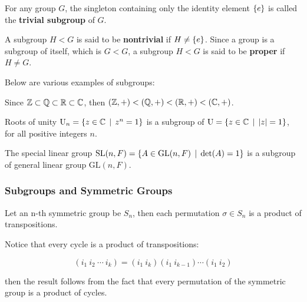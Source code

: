 \documentclass[a4paper,12pt]{article}
\begin{document}
\begin{dft}
  For any group $G$, the singleton containing only the identity element $\left\{ e\right\}$ is called the \textbf{trivial subgroup} of $G$.\n

  A subgroup $H<G$ is said to be \textbf{nontrivial} if $H\neq\left\{ e\right\}$. Since a group is a subgroup of itself, which is $G<G$, a subgroup $H<G$ is said to be \textbf{proper} if $H\neq G$.
\end{dft}

\begin{exm}
  Below are various examples of subgroups:

  \begin{alist}
    \item Since $\mathbb{Z}\subset\mathbb{Q}\subset\mathbb{R}\subset\mathbb{C}$, then $(\mathbb{Z},+)<(\mathbb{Q},+)<(\mathbb{R},+)<(\mathbb{C},+)$.
    \item Roots of unity $\mathrm{U}_{n}=\left\{ z\in\mathbb{C}\,\mid\, z^{n}=1\right\}$ is a subgroup of $\mathrm{U}=\left\{ z\in\mathbb{C}\,\mid\,\left| z\right|=1\right\}$, for all positive integers $n$.
    \item The special linear group $\mathrm{SL}(n,F)=\left\{ A\in\mathrm{GL}(n,F)\,\mid\,\det(A)=1\right\}$ is a subgroup of general linear group $\mathrm{GL}(n,F)$.
  \end{alist}
\end{exm}

\subsubsection{Subgroups and Symmetric Groups}
\begin{pst}
  Let an n-th symmetric group be $S_{n}$, then each permutation $\sigma\in S_{n}$ is a product of transpositions.\n

  \prf Notice that every cycle is a product of transpositions:

  $$(i_{1}\: i_{2}\:\cdots\: i_{k})=(i_{1}\: i_{k})(i_{1}\: i_{k-1})\cdots(i_{1}\: i_{2})$$\s

  then the result follows from the fact that every permutation of the symmetric group is a product of cycles.
\end{pst}\n
\end{document}
